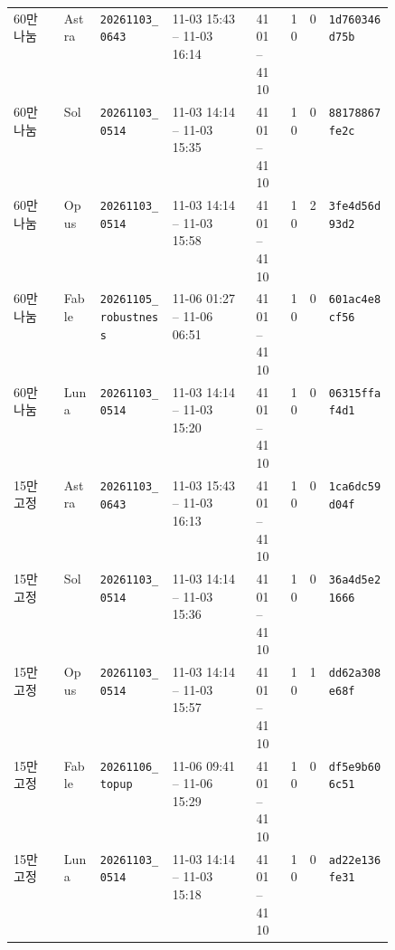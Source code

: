 \begin{table}[H]
\begin{tabularx}{\linewidth}{@{}l l p{0.19\linewidth} p{0.22\linewidth} p{0.08\linewidth} r r X@{}}
\midrule
60만 나눔 & Astra & \texttt{20261103\_0643} & 11-03 15:43 -- 11-03 16:14 & 4101--4110 & 10 & 0 & \texttt{1d760346d75b} \\
60만 나눔 & Sol & \texttt{20261103\_0514} & 11-03 14:14 -- 11-03 15:35 & 4101--4110 & 10 & 0 & \texttt{88178867fe2c} \\
60만 나눔 & Opus & \texttt{20261103\_0514} & 11-03 14:14 -- 11-03 15:58 & 4101--4110 & 10 & 2 & \texttt{3fe4d56d93d2} \\
60만 나눔 & Fable & \texttt{20261105\_robustness} & 11-06 01:27 -- 11-06 06:51 & 4101--4110 & 10 & 0 & \texttt{601ac4e8cf56} \\
60만 나눔 & Luna & \texttt{20261103\_0514} & 11-03 14:14 -- 11-03 15:20 & 4101--4110 & 10 & 0 & \texttt{06315ffaf4d1} \\
\midrule
15만 고정 & Astra & \texttt{20261103\_0643} & 11-03 15:43 -- 11-03 16:13 & 4101--4110 & 10 & 0 & \texttt{1ca6dc59d04f} \\
15만 고정 & Sol & \texttt{20261103\_0514} & 11-03 14:14 -- 11-03 15:36 & 4101--4110 & 10 & 0 & \texttt{36a4d5e21666} \\
15만 고정 & Opus & \texttt{20261103\_0514} & 11-03 14:14 -- 11-03 15:57 & 4101--4110 & 10 & 1 & \texttt{dd62a308e68f} \\
15만 고정 & Fable & \texttt{20261106\_topup} & 11-06 09:41 -- 11-06 15:29 & 4101--4110 & 10 & 0 & \texttt{df5e9b606c51} \\
15만 고정 & Luna & \texttt{20261103\_0514} & 11-03 14:14 -- 11-03 15:18 & 4101--4110 & 10 & 0 & \texttt{ad22e136fe31} \\
\bottomrule
\end{tabularx}
\end{table}

